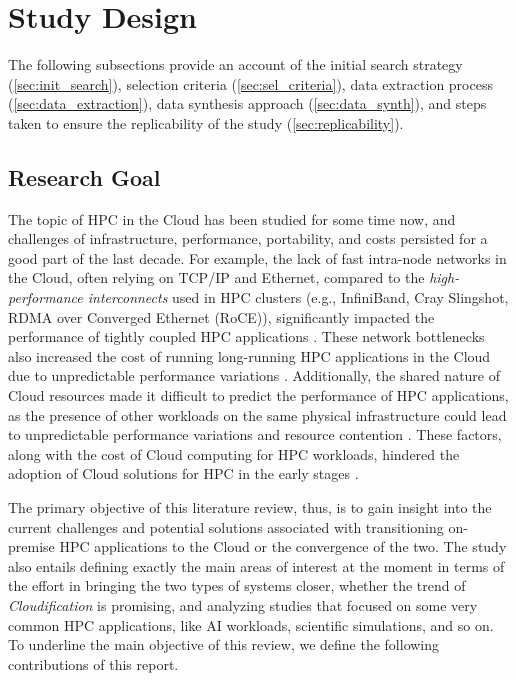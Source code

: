 \section{Study Design}\label{sec:design}
The following subsections provide an account of the initial search strategy (\autoref{sec:init_search}), selection criteria (\autoref{sec:sel_criteria}), data extraction process (\autoref{sec:data_extraction}), data synthesis approach (\autoref{sec:data_synth}), and steps taken to ensure the replicability of the study (\autoref{sec:replicability}).


\subsection{Research Goal}
\label{sec:research_goal}

    The topic of HPC in the Cloud has been studied for some time now, and challenges of infrastructure, performance, portability, and costs persisted for a good part of the last decade. For example, the lack of fast intra-node networks in the Cloud, often relying on TCP/IP and Ethernet, compared to the \textit{high-performance interconnects} used in HPC clusters (e.g., InfiniBand, Cray Slingshot, RDMA over Converged Ethernet (RoCE)), significantly impacted the performance of tightly coupled HPC applications \cite{wang2010cloud, gupta2014challenges}. These network bottlenecks also increased the cost of running long-running HPC applications in the Cloud due to unpredictable performance variations \cite{gupta2014challenges, marathe2013challenges, de_sensi_noise_2022}. Additionally, the shared nature of Cloud resources made it difficult to predict the performance of HPC applications, as the presence of other workloads on the same physical infrastructure could lead to unpredictable performance variations and resource contention \cite{gupta2014challenges, marathe2013challenges}. These factors, along with the cost of Cloud computing for HPC workloads, hindered the adoption of Cloud solutions for HPC in the early stages \cite{jackson2010performance, gupta2014challenges, marathe2013challenges}.

    The primary objective of this literature review, thus, is to gain insight into the current challenges and potential solutions associated with transitioning on-premise HPC applications to the Cloud or the convergence of the two. The study also entails defining exactly the main areas of interest at the moment in terms of the effort in bringing the two types of systems closer, whether the trend of \textit{Cloudification} is promising, and analyzing studies that focused on some very common HPC applications, like AI workloads, scientific simulations, and so on.  To underline the main objective of this review, we define the following contributions of this report.

